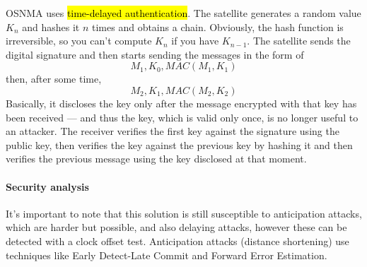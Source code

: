 OSNMA uses \hl{time-delayed authentication}. The satellite generates a random
value $K_n$ and hashes it $n$ times and obtains a chain. Obviously, the hash
function is irreversible, so you can't compute $K_n$ if you have $K_{n-1}$. The
satellite sends the digital signature and then starts sending the messages in
the form of \[ M_1, K_0,MAC(M_1, K_1)\] then, after some time, \[ M_2, K_1,MAC(M_2, K_2)\]
Basically, it discloses the key only after the message encrypted with that key
has been received --- and thus the key, which is valid only once, is no longer
useful to an attacker. The receiver verifies the first key against the
signature using the public key, then verifies the key against the previous key
by hashing it and then verifies the previous message using the key disclosed at
that moment.

\paragraph{Security analysis}
It's important to note that this solution is still susceptible to anticipation
attacks, which are harder but possible, and also delaying attacks, however
these can be detected with a clock offset test. Anticipation attacks (distance
shortening) use techniques like Early Detect-Late Commit and Forward Error
Estimation.